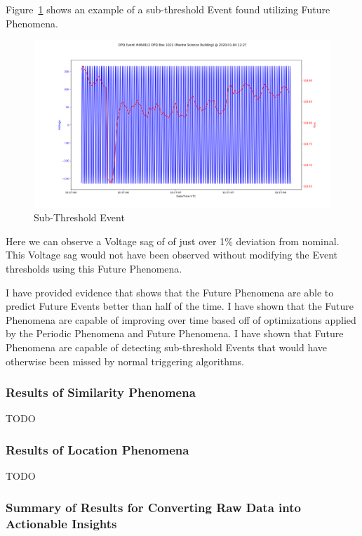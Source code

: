 Figure~\ref{fig:sub_thresh_event} shows an example of a sub-threshold Event found utilizing Future Phenomena.

\begin{figure}[h]
    \centering
    \includegraphics[width=\linewidth]{figures/event-single-464912.png}
    \caption{Sub-Threshold Event}
    \label{fig:sub_thresh_event}
\end{figure}

Here we can observe a Voltage sag of of just over 1\% deviation from nominal. This Voltage sag would not have been observed without modifying the Event thresholds using this Future Phenomena.

I have provided evidence that shows that the Future Phenomena are able to predict Future Events better than half of the time. I have shown that the Future Phenomena are capable of improving over time based off of optimizations applied by the Periodic Phenomena and Future Phenomena. I have shown that Future Phenomena are capable of detecting sub-threshold Events that would have otherwise been missed by normal triggering algorithms.

\subsubsection{Results of Similarity Phenomena}

TODO

\subsubsection{Results of Location Phenomena}

TODO

\subsubsection{Summary of Results for Converting Raw Data into Actionable Insights}

